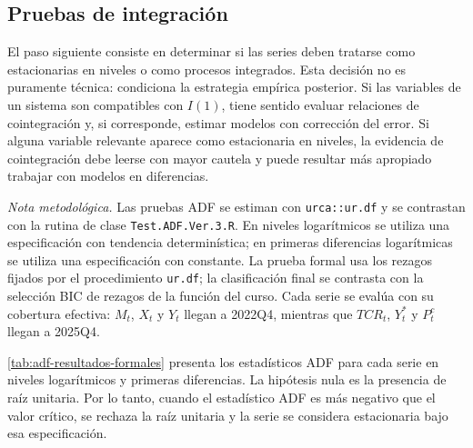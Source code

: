 \documentclass[11pt,a4paper]{article}
\begin{document}
	\subsection{Pruebas de integración}
	\label{subsec:resultados-integracion}

	El paso siguiente consiste en determinar si las series deben tratarse como
	estacionarias en niveles o como procesos integrados. Esta decisión no es
	puramente técnica: condiciona la estrategia empírica posterior. Si las variables
	de un sistema son compatibles con \(I(1)\), tiene sentido evaluar relaciones de
	cointegración y, si corresponde, estimar modelos con corrección del error. Si
	alguna variable relevante aparece como estacionaria en niveles, la evidencia de
	cointegración debe leerse con mayor cautela y puede resultar más apropiado
	trabajar con modelos en diferencias.

	\noindent\textit{Nota metodológica.} Las pruebas ADF se estiman con
	\texttt{urca::ur.df} y se contrastan con la rutina de clase
	\texttt{Test.ADF.Ver.3.R}. En niveles
	logarítmicos se utiliza una especificación con tendencia determinística; en
	primeras diferencias logarítmicas se utiliza una especificación con constante.
	La prueba formal usa los rezagos fijados por el procedimiento \texttt{ur.df}; la
	clasificación final se contrasta con la selección BIC de rezagos de la función
	del curso. Cada serie se evalúa con su cobertura efectiva: \(M_t\), \(X_t\) y
	\(Y_t\) llegan a 2022Q4, mientras que \(TCR_t\), \(Y_t^*\) y \(P_t^c\) llegan a
	2025Q4.

	\autoref{tab:adf-resultados-formales} presenta los estadísticos ADF para cada
	serie en niveles logarítmicos y primeras diferencias. La hipótesis nula es la
	presencia de raíz unitaria. Por lo tanto, cuando el estadístico ADF es más
	negativo que el valor crítico, se rechaza la raíz unitaria y la serie se
	considera estacionaria bajo esa especificación.
\end{document}
